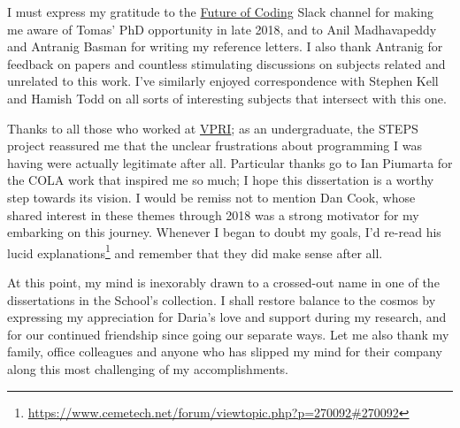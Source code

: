 \documentclass[ twoside,openright,titlepage,numbers=noenddot,headinclude,footinclude,cleardoublepage=empty,abstract=on,
                BCOR=5mm,paper=a4,fontsize=11pt
                ]{scrreprt}
\theoremstyle{definition}
\begin{document}
I must express my gratitude to the
\href{https://futureofcoding.org/}{Future of Coding} Slack channel for
making me aware of Tomas' PhD opportunity in late 2018, and to Anil
Madhavapeddy and Antranig Basman for writing my reference letters. I
also thank Antranig for feedback on papers and countless stimulating
discussions on subjects related and unrelated to this work. I've
similarly enjoyed correspondence with Stephen Kell and Hamish Todd on
all sorts of interesting subjects that intersect with this one.

Thanks to all those who worked at \href{https://vpri.org/}{VPRI}; as an
undergraduate, the STEPS project reassured me that the unclear
frustrations about programming I was having were actually legitimate
after all. Particular thanks go to Ian Piumarta for the \acs{COLA} work
that inspired me so much; I hope this dissertation is a worthy step
towards its vision. I would be remiss not to mention Dan Cook, whose
shared interest in these themes through 2018 was a strong motivator for
my embarking on this journey. Whenever I began to doubt my goals, I'd
re-read his lucid explanations\footnote{\url{https://www.cemetech.net/forum/viewtopic.php?p=270092\#270092}}
and remember that they did make sense after all.

At this point, my mind is inexorably drawn to a crossed-out name in one
of the dissertations in the School's collection. I shall restore balance
to the cosmos by expressing my appreciation for Daria's love and support
during my research, and for our continued friendship since going our
separate ways. Let me also thank my family, office colleagues and anyone
who has slipped my mind for their company along this most challenging of
my accomplishments.
 
\endgroup
\clearpage{}
\cleardoublepage\clearpage{}\pagestyle{scrheadings}
\setcounter{tocdepth}{2} \setcounter{secnumdepth}{3} \manualmark
\markboth{\spacedlowsmallcaps{\contentsname}}{\spacedlowsmallcaps{\contentsname}}
\tableofcontents
{}
\renewcommand{\chaptermark}[1]{\markboth{\spacedlowsmallcaps{#1}}{\spacedlowsmallcaps{#1}}}
\renewcommand{\sectionmark}[1]{\markright{\textsc{\thesection}\enspace\spacedlowsmallcaps{#1}}}
\clearpage
\begingroup
    \let\clearpage\relax
    \let\cleardoublepage\relax
{}
    \listoffigures

    \vspace{8ex}

    \listoftables
\end{document}
